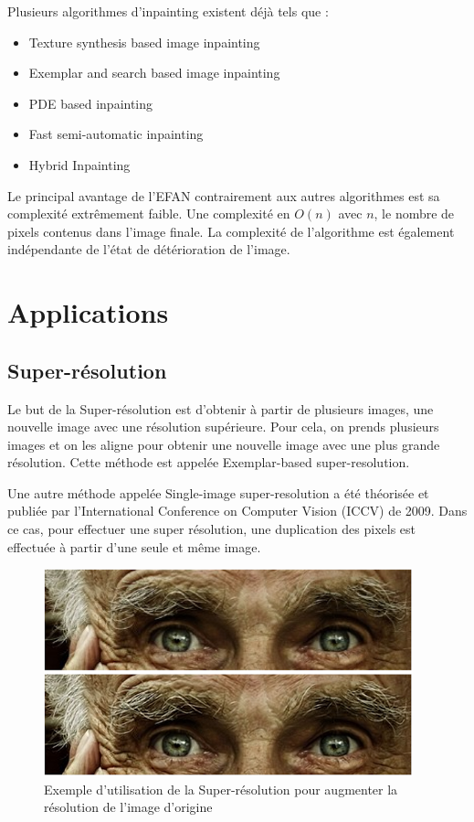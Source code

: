 \documentclass[]{article}
\providecommand{\tightlist}{%
  \setlength{\itemsep}{0pt}\setlength{\parskip}{0pt}}
\begin{document}
Plusieurs algorithmes d'inpainting existent déjà tels que :

\begin{itemize}
\tightlist
\item
  Texture synthesis based image inpainting
\item
  Exemplar and search based image inpainting
\item
  PDE based inpainting
\item
  Fast semi-automatic inpainting
\item
  Hybrid Inpainting
\end{itemize}

Le principal avantage de l'EFAN contrairement aux autres algorithmes est
sa complexité extrêmement faible. Une complexité en \(O(n)\) avec \(n\),
le nombre de pixels contenus dans l'image finale. La complexité de
l'algorithme est également indépendante de l'état de détérioration de
l'image.

\newpage

\hypertarget{applications}{%
\section{Applications}\label{applications}}

\hypertarget{super-ruxe9solution}{%
\subsection{Super-résolution}\label{super-ruxe9solution}}

Le but de la Super-résolution est d'obtenir à partir de plusieurs
images, une nouvelle image avec une résolution supérieure. Pour cela, on
prends plusieurs images et on les aligne pour obtenir une nouvelle image
avec une plus grande résolution. Cette méthode est appelée
Exemplar-based super-resolution.

Une autre méthode appelée Single-image super-resolution a été théorisée
et publiée par l'International Conference on Computer Vision (ICCV) de
2009. Dans ce cas, pour effectuer une super résolution, une duplication
des pixels est effectuée à partir d'une seule et même image.

\begin{figure}
\centering
    \includegraphics[height=6cm]{img/superresolution.png}
\caption{Exemple d'utilisation de la Super-résolution pour augmenter la
résolution de l'image d'origine}
\end{figure}
\end{document}
